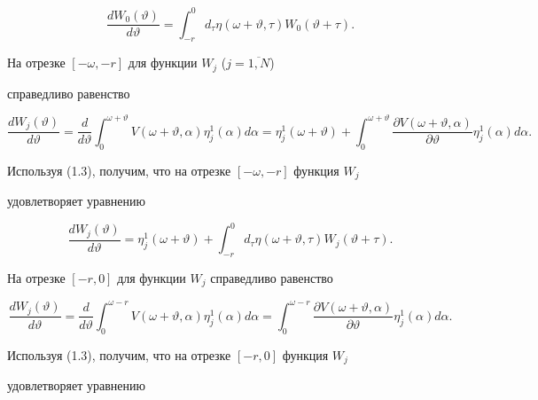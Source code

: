 \begin{equation}


\frac{dW_{0}(\vartheta)}{d \vartheta} = \int_{-r}^{0} d_{\tau}


\eta(\omega+ \vartheta, \tau) W_{0}(\vartheta+ \tau).


\end{equation}


На отрезке $[-\omega,-r]$ для функции $W_{j}$ ($j= \overline{1,N}$) 


справедливо равенство


$$


\frac{dW_{j}(\vartheta)}{d \vartheta} = \frac{d}{d \vartheta}


\int_{0}^{\omega+ \vartheta} V(\omega+ \vartheta, \alpha)


\eta_{j}^{1}(\alpha) d \alpha=


\eta_{j}^{1}(\omega+ \vartheta) + \int_{0}^{\omega+ \vartheta}


\frac{\partial V(\omega+ \vartheta, \alpha)}{\partial \vartheta}


\eta_{j}^{1}(\alpha) d \alpha.


$$


Используя (1.3), получим, что на отрезке $[-\omega,-r]$ функция $W_{j}$


удовлетворяет уравнению


$$


\frac{dW_{j}(\vartheta)}{d \vartheta} = \eta_{j}^{1}(\omega+ \vartheta)


+ \int_{-r}^{0}d_{\tau} \eta(\omega+ \vartheta, \tau)


W_{j}(\vartheta+ \tau).


$$


На отрезке $[-r,0]$ для функции $W_{j}$ справедливо равенство


$$


\frac{dW_{j}(\vartheta) }{d \vartheta} = \frac{d}{d \vartheta}


\int_{0}^{\omega-r} V(\omega+ \vartheta, \alpha) \eta_{j}^{1}(\alpha)


d \alpha = \int_{0}^{\omega-r} \frac{\partial V(\omega+ \vartheta, \alpha)}


{\partial \vartheta} \eta_{j}^{1}(\alpha)d \alpha.


$$


Используя (1.3), получим, что на отрезке $[-r,0]$ функция $W_{j}$


удовлетворяет уравнению


$$


